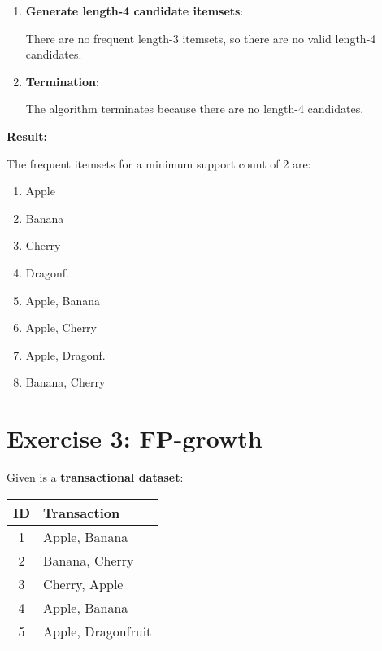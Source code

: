 \documentclass[
english,
smallborders
]{i6prcsht}
\begin{document}
\begin{solution}
\begin{enumerate}
		\item \textbf{Generate length-4 candidate itemsets}:
		      
		      There are no frequent length-3 itemsets, so there are no valid length-4 candidates.
		      
		\item \textbf{Termination}:
		      
		      The algorithm terminates because there are no length-4 candidates.
		      
	\end{enumerate}
	
	\textbf{Result:}
	
	\vspace*{-0.2cm}
	
	The frequent itemsets for a minimum support count of 2 are:
	
	\begin{multicols}{4}
		\begin{enumerate}
			\item Apple
			\item Banana
			\item Cherry
			\item Dragonf.
			\item Apple, Banana
			\item Apple, Cherry
			\item Apple, Dragonf.
			\item Banana, Cherry
		\end{enumerate}
	\end{multicols}
\end{solution}

\section*{Exercise 3: FP-growth}

Given is a \textbf{transactional dataset}:

\begin{center}
	\begin{tabular}{|c|l|}
		\hline
		\textbf{ID} & \textbf{Transaction} \\
		\hline
		1           & Apple, Banana        \\
		\hline
		2           & Banana, Cherry       \\
		\hline
		3           & Cherry, Apple        \\
		\hline
		4           & Apple, Banana        \\
		\hline
		5           & Apple, Dragonfruit   \\
		\hline
	\end{tabular}
\end{center}
\end{document}
